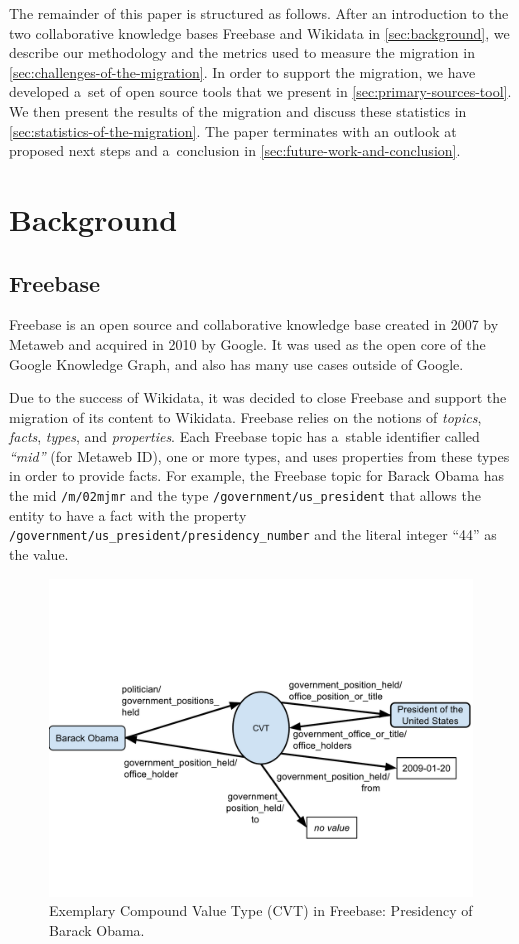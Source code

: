 \documentclass{acm_proc_article-sp}
\begin{document}
The remainder of this paper is structured as follows.
After an introduction to the two collaborative knowledge bases
Freebase and Wikidata in \autoref{sec:background},
we describe our methodology and the metrics used to measure the migration
in \autoref{sec:challenges-of-the-migration}.
In order to support the migration, we have developed a~set of open source tools
that we present in \autoref{sec:primary-sources-tool}.
We then present the results of the migration
and discuss these statistics in \autoref{sec:statistics-of-the-migration}.
The paper terminates with an outlook at proposed next steps
and a~conclusion in \autoref{sec:future-work-and-conclusion}.

\section{Background}\label{sec:background}

\subsection{Freebase}

Freebase is an open source and
collaborative knowledge base created in 2007 by Metaweb and acquired in 2010 by Google.
It was used as the open core of the Google Knowledge Graph,
and also has many use cases outside of Google.

Due to the success of Wikidata,
it was decided to close Freebase and support the migration of its content to Wikidata.
Freebase relies on the notions of \emph{topics}, \emph{facts}, \emph{types}, and \emph{properties}.
Each Freebase topic has a~stable identifier called \emph{``mid''} (for Metaweb ID),
one or more types, and uses properties from these types in order to provide facts.
For example, the Freebase topic for Barack Obama has the mid \texttt{/m/02mjmr}
and the type \texttt{/government/us\_president} that allows the entity to have
a fact with the property \texttt{/government/us\_president/presidency\_number}
and the literal integer ``44'' as the value.

\begin{figure}[!htbp]
\centering
\includegraphics[trim=0cm 3cm 0cm 5cm, width=8.45 cm]{img/freebase-cvt-obama.pdf}
\caption{Exemplary Compound Value Type (CVT) in Freebase: Presidency of Barack Obama.}
\label{fig:cvt-obama}
\end{figure}
\end{document}
